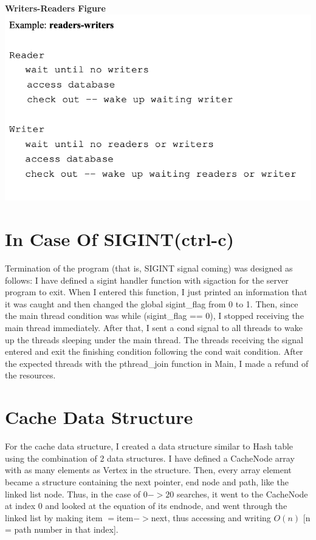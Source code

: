 \documentclass{article}
\begin{document}
\newpage 

\begin{center}
    \textbf{Writers-Readers Figure \\}
    \includegraphics[scale=0.6]{writers-readers.png} \\[0.5in]
\end{center}



\section{In Case Of SIGINT(ctrl-c)}
\par{Termination of the program (that is, SIGINT signal coming) was designed as follows: I have defined a sigint handler function with sigaction for the server program to exit. When I entered this function, I just printed an information that it was caught and then changed the global sigint\_flag from 0 to 1. Then, since the main thread condition was while (sigint\_flag == 0), I stopped receiving the main thread immediately. After that, I sent a cond signal to all threads to wake up the threads sleeping under the main thread. The threads receiving the signal entered and exit the finishing condition following the cond wait condition. After the expected threads with the pthread\_join function in Main, I made a refund of the resources.}

\section{Cache Data Structure}
\par{For the cache data structure, I created a data structure similar to Hash table using the combination of 2 data structures. I have defined a CacheNode array with as many elements as Vertex in the structure. Then, every array element became a structure containing the next pointer, end node and path, like the linked list node. Thus, in the case of $0->20$ searches, it went to the CacheNode at index 0 and looked at the equation of its endnode, and went through the linked list by making item $=$item$->$next, thus accessing and writing $O (n)$ [n = path number in that index].}
\end{document}
